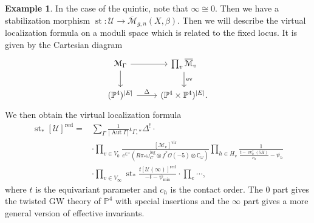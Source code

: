 \documentclass[10pt]{amsart}
\theoremstyle{definition}
\newtheorem{exm}[thm]{Example}
\theoremstyle{remark}
\theoremstyle{plain}
\theoremstyle{definition}
\theoremstyle{remark}
\newcommand{\C}{\mathbb{C}}
\renewcommand{\P}{\mathbb{P}}
\newcommand{\Mbar}{\overline{\mathcal{M}}}
\newcommand{\mc}[1]{\mathcal{#1}}
\newcommand{\mr}[1]{\mathrm{#1}}
\newcommand{\on}[1]{\operatorname{#1}}
\newcommand{\1}{\mathbf{1}}
\newcommand{\2}{\mathbf{2}}
\newcommand{\3}{\mathbf{3}}
\newcommand{\vir}{\mr{vir}}
\newcommand{\red}{\mr{red}}
\DeclareMathOperator{\Aut}{Aut}
\DeclareMathOperator{\ev}{ev}
\begin{document}
\begin{exm}
    In the case of the quintic, note that $\infty \cong 0$. Then we have a stabilization morphism $\on{st} \colon\mc{U} \to \Mbar_{g,n}(X,\beta)$. Then we will describe the virtual localization formula on a moduli space which is related to the fixed locus. It is given by the Cartesian diagram
    \begin{equation*}
    \begin{tikzcd}
        \mc{M}_{\Gamma} \ar{r} \ar{d} & \prod_v \Mbar_v \ar{d}{\ev} \\
        (\P^4)^{|E|} \ar{r}{\Delta} & (\P^4 \times \P^4)^{|E|}.
    \end{tikzcd}
    \end{equation*}
    We then obtain the virtual localization formula
    \begin{align*}
        \on{st}_* [\mc{U}]^{\red} ={}& \sum_{\Gamma} \frac{1}{|\Aut \Gamma|} \iota_{\Gamma,*} \Delta^! \cdot \\
        &\cdot \prod_{v \in V_0} \frac{[\mc{M}_v]^{\vir}}{e^{\C^{\times}}(R\pi_* \omega_C^{\log} \otimes f^* \mc{O}(-5) \otimes \C_{\omega})} \prod_{h \in H_v} \frac{1}{\frac{ t-\ev_h^*(5H) }{c_h} - \psi_h} \\
        &\cdot \prod_{v \in V_{\infty}} \on{st}_* \frac{t [\mc{U}(\infty)]^{\red}}{-t-\psi_{\min}} 
        \cdot \prod_{e} \cdots,
    \end{align*}
    where $t$ is the equivariant parameter and $c_h$ is the contact order. The $0$ part gives the twisted GW theory of $\P^4$ with special insertions and the $\infty$ part gives a more general version of effective invariants.
\end{exm}
\end{document}
